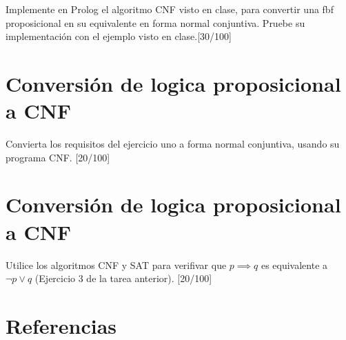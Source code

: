 \documentclass[11pt, letterpaper]{article}
\begin{document}
	Implemente en Prolog el algoritmo CNF visto en clase, para convertir una
	fbf proposicional en su equivalente en forma normal conjuntiva. Pruebe su
	implementación con el ejemplo visto en clase.[30/100]
		
	\newpage
	
	\section{Conversión de logica proposicional a CNF}
	
	Convierta los requisitos del ejercicio uno a forma normal conjuntiva, usando
	su programa CNF. [20/100] \\
	
	\newpage

	\section{Conversión de logica proposicional a CNF}

	Utilice los algoritmos CNF y SAT para verifivar que $p \implies q$ es equivalente a $\neg p \vee q$ (Ejercicio 3 de la tarea anterior). [20/100] \\


		
\newpage


\section{Referencias}  %


	
	
\end{document}
